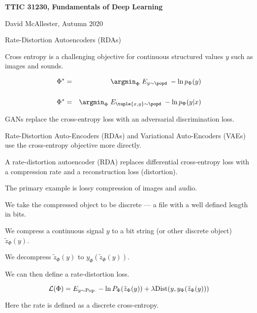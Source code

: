 





{\Huge

  \centerline{\bf TTIC 31230, Fundamentals of Deep Learning}
  \bigskip
  \centerline{David McAllester, Autumn 2020}
  \vfill
  \centerline{Rate-Distortion Autoencoders (RDAs)}
  \vfill
  \vfill


Cross entropy is a challenging objective for continuous structured values $y$ such as images and sounds.

\vfill
\begin{eqnarray*}
\Phi^* & = & \argmin_\Phi \;E_{y \sim \popd}\;-\ln p_\Phi(y) \\
\\
\Phi^* & = & \argmin_\Phi \;E_{\tuple{x,y} \sim \popd}\;-\ln p_\Phi(y|x)
\end{eqnarray*}

\vfill
GANs replace the cross-entropy loss with an adversarial discrimination loss.

\vfill
Rate-Distortion Auto-Encoders (RDAs) and Variational Auto-Encoders (VAEs) use the cross-entropy objective more directly.


A rate-distortion autoencoder (RDA) replaces differential cross-entropy loss with a compression rate and
a reconstruction loss (distortion).

\vfill
The primary example is lossy compression of images and audio.

\vfill
We take the compressed object to be discrete --- a file with a well defined length in bits.


We compress a continuous signal $y$ to a bit string (or other discrete object) $\tilde{z}_\Phi(y)$.

\vfill
We decompress $\tilde{z}_\Phi(y)$ to $y_\Phi(\tilde{z}_\Phi(y))$.

\vfill
We can then define a rate-distortion loss.

{\color{red} $${\cal L}(\Phi) = E_{y \sim \mathrm{Pop}}\;-\ln P_\Phi(\tilde{z}_\Phi(y)) + \lambda \mathrm{Dist}(y,y_\Phi(\tilde{z}_\Phi(y)))$$}

\vfill
Here the rate is defined as a discrete cross-entropy.


}
